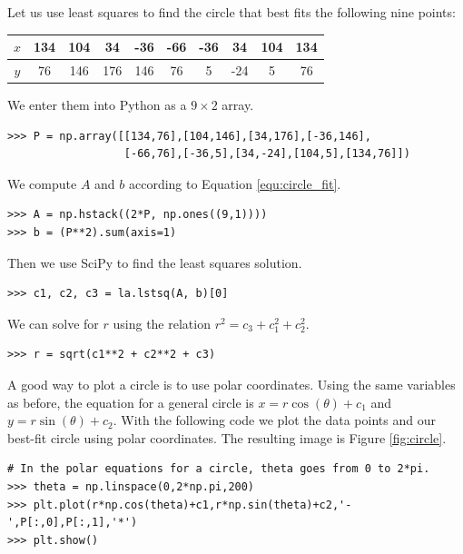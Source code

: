 Let us use least squares to find the circle that best fits the following nine points:
\begin{center}
\begin{tabular}{c||c|c|c|c|c|c|c|c|c}
$x$& 134  &104 &34  &-36  &-66  &-36  &34 &104 &  134  \\ \hline
$y$& 76&  146&  176&  146 &  76&  5& -24 & 5 & 76\\
\end{tabular}
\end{center}


We enter them into Python as a $9\times 2$ array.
\begin{lstlisting}
>>> P = np.array([[134,76],[104,146],[34,176],[-36,146],
                  [-66,76],[-36,5],[34,-24],[104,5],[134,76]])
\end{lstlisting}

We compute $A$ and $b$ according to Equation \ref{equ:circle_fit}.
\begin{lstlisting}
>>> A = np.hstack((2*P, np.ones((9,1))))
>>> b = (P**2).sum(axis=1)
\end{lstlisting}

Then we use SciPy to find the least squares solution.
\begin{lstlisting}
>>> c1, c2, c3 = la.lstsq(A, b)[0]
\end{lstlisting}

We can solve for $r$ using the relation $r^2 = c_3+c_1^2+c_2^2$.
\begin{lstlisting}
>>> r = sqrt(c1**2 + c2**2 + c3)
\end{lstlisting}

A good way to plot a circle is to use polar coordinates. 
Using the same variables as before, the equation for a general circle is $x=r\cos(\theta)+c_1$ and $y=r\sin(\theta)+c_2$. 
With the following code we plot the data points and our best-fit circle using polar coordinates. 
The resulting image is Figure \ref{fig:circle}.
\begin{lstlisting}
# In the polar equations for a circle, theta goes from 0 to 2*pi.
>>> theta = np.linspace(0,2*np.pi,200)
>>> plt.plot(r*np.cos(theta)+c1,r*np.sin(theta)+c2,'-',P[:,0],P[:,1],'*')
>>> plt.show()
\end{lstlisting}

